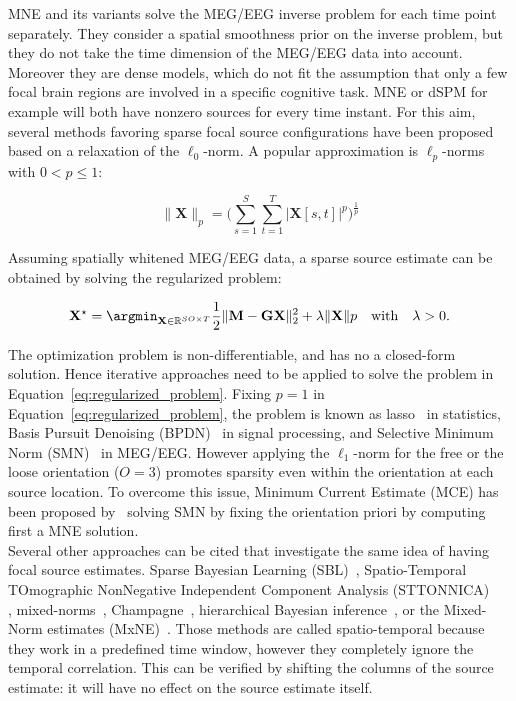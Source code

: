 MNE and its variants solve the MEG/EEG inverse problem for each time point separately. They consider a spatial smoothness prior on the inverse problem, but they do not take the time dimension of the MEG/EEG data into account. Moreover they are dense models, which do not fit the assumption that only a few focal brain regions are involved in a specific cognitive task. MNE or dSPM for example will both have nonzero sources for every time instant.
For this aim, several methods favoring sparse focal source configurations have been proposed based on a relaxation of the $\ell_0$-norm. A popular approximation is $\ell_p$-norms with $0<p\leq 1$:

\begin{equation} 
\|\mathbf{X}\|_p = \Big(\sum_{s=1}^S\sum_{t=1}^T|\mathbf{X}[s,t]|^p\Big)^{\frac{1}{p}}
\end{equation} \label{eq:lp_norms}

Assuming spatially whitened MEG/EEG data, a sparse source estimate can be obtained by solving the regularized problem:

\begin{equation}
\mathbf{X}^\star = \argmin_{\mathbf{X}\in\RR^{SO\times T}} \frac{1}{2}\|\mathbf{M}-\mathbf{GX}\|_2^2 + \lambda\|\mathbf{X}\|p \hspace{10pt} \mathrm{with} \hspace{10pt} \lambda > 0.
\end{equation} \label{eq:regularized_problem}

The optimization problem is non-differentiable, and has no a closed-form solution. Hence iterative approaches need to be applied to solve the problem in Equation~\eqref{eq:regularized_problem}. Fixing $p=1$ in Equation~\eqref{eq:regularized_problem}, the problem is known as \ac{lasso}~\cite{Tibshirani96} in statistics, Basis Pursuit Denoising (BPDN)~\cite{Chen_Donoho_Saunders98} in signal processing, and Selective Minimum Norm (SMN)~\cite{matsuura1995selective} in MEG/EEG. However applying the $\ell_1$-norm for the free or the loose orientation ($O=3$) promotes sparsity even within the orientation at each source location. To overcome this issue, Minimum Current Estimate (MCE) has been proposed by~\cite{Uutela-etal:1999} solving SMN by fixing the orientation priori by computing first a MNE solution. \\

Several other approaches can be cited that investigate the same idea of having focal source estimates. Sparse Bayesian Learning (SBL)~\cite{wipf2006bayesian}, Spatio-Temporal TOmographic NonNegative Independent Component Analysis (STTONNICA)\\\cite{valdes2009eeg}, mixed-norms~\cite{ou2009distributed}, Champagne~\cite{owen2012performance}, hierarchical Bayesian inference~\cite{lucka2012hierarchical}, or the Mixed-Norm estimates (MxNE)~\cite{gramfort2012mixed}. Those methods are called spatio-temporal because they work in a predefined time window, however they completely ignore the temporal correlation. This can be verified by shifting the columns of the source estimate: it will have no effect on the source estimate itself. \\

